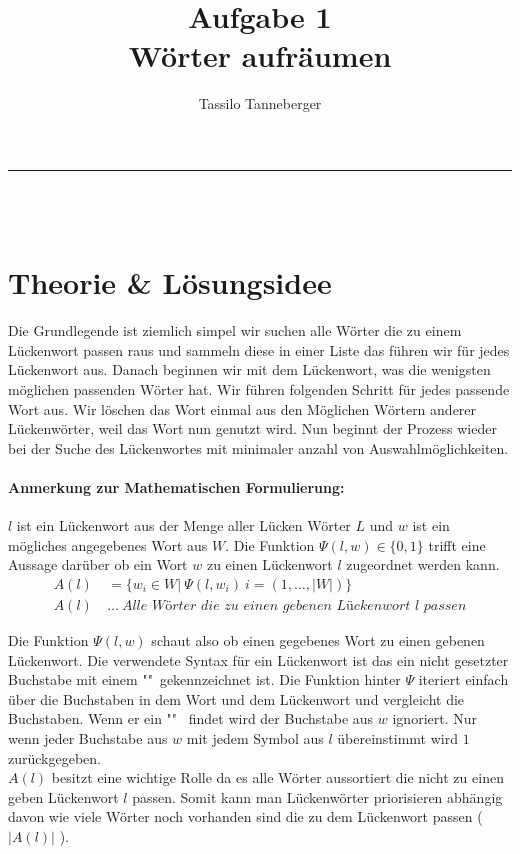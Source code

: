 \documentclass{article}
\title{Aufgabe 1\\Wörter aufräumen}
\author{Tassilo Tanneberger}
\makeatletter
\newcommand{\linia}{\rule{\linewidth}{1pt}}
\renewcommand{\maketitle}{\begin{center}
\Huge \@title\end{center}
\linia\\
{\large\@author\hfill\@date\\}}
\makeatother
\begin{document}
\maketitle


\section*{Theorie \& Lösungsidee}

Die Grundlegende ist ziemlich simpel wir suchen alle Wörter die zu einem Lückenwort passen raus und sammeln diese in einer Liste das führen wir für jedes Lückenwort aus. Danach beginnen wir mit dem Lückenwort, was die wenigsten möglichen passenden Wörter hat. Wir führen folgenden Schritt für jedes passende Wort aus. Wir löschen das Wort einmal aus den Möglichen Wörtern anderer Lückenwörter, weil das Wort nun genutzt wird. Nun beginnt der Prozess wieder bei der Suche des Lückenwortes mit minimaler anzahl von Auswahlmöglichkeiten.

\paragraph*{Anmerkung zur Mathematischen Formulierung: } $ l $ ist ein Lückenwort aus der Menge aller Lücken Wörter $ L $ und $ w $ ist ein mögliches angegebenes Wort aus $ W $. Die Funktion $ \Psi (l, w) \in \lbrace 0, 1 \rbrace $ trifft eine Aussage darüber ob ein Wort $ w $ zu einen Lückenwort $ l $ zugeordnet werden kann.
\begin{align*}
	A(l) &= \lbrace w_i \in W \vert\ \Psi (l, w_i)\ i = (1, \dots, \vert W \vert ) \rbrace \\
	A(l) \ & \dots \ \textit{Alle Wörter die zu einen gebenen Lückenwort } l \textit{ passen}
\end{align*}

\noindent Die Funktion $ \Psi (l, w) $ schaut also ob einen gegebenes Wort zu einen gebenen Lückenwort. Die verwendete Syntax für ein Lückenwort ist das ein nicht gesetzter Buchstabe mit einem "\textunderscore "\ gekennzeichnet ist. Die Funktion hinter $ \Psi $ iteriert einfach über die Buchstaben in dem Wort und dem Lückenwort und vergleicht die Buchstaben. Wenn er ein "\textunderscore " \ findet wird der Buchstabe aus $ w $ ignoriert. Nur wenn jeder Buchstabe aus $ w $ mit jedem Symbol aus $ l $ übereinstimmt wird $ 1 $ zurückgegeben. \\

\noindent $ A(l) $ besitzt eine wichtige Rolle da es alle Wörter aussortiert die nicht zu einen geben Lückenwort $ l $ passen. Somit kann man Lückenwörter priorisieren abhängig davon wie viele Wörter noch vorhanden sind die zu dem Lückenwort passen ( $ \vert A(l) \vert $ ). \\
\end{document}

